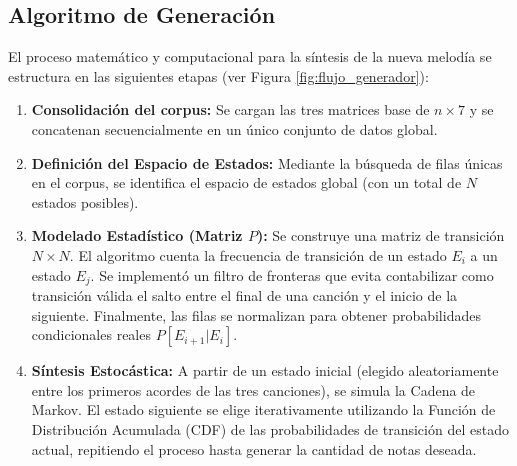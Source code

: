 \documentclass{article}
\theoremstyle{plain}
\theoremstyle{definition}
\begin{document}
\subsection*{Algoritmo de Generación}
El proceso matemático y computacional para la síntesis de la nueva melodía se estructura en las siguientes etapas (ver Figura \ref{fig:flujo_generador}):

\begin{enumerate}
	\item \textbf{Consolidación del corpus:} Se cargan las tres matrices base de $n \times 7$ y se concatenan secuencialmente en un único conjunto de datos global.
	\item \textbf{Definición del Espacio de Estados:} Mediante la búsqueda de filas únicas en el corpus, se identifica el espacio de estados global (con un total de $N$ estados posibles).
	\item \textbf{Modelado Estadístico (Matriz $P$):} Se construye una matriz de transición $N \times N$. El algoritmo cuenta la frecuencia de transición de un estado $E_i$ a un estado $E_j$. Se implementó un filtro de fronteras que evita contabilizar como transición válida el salto entre el final de una canción y el inicio de la siguiente. Finalmente, las filas se normalizan para obtener probabilidades condicionales reales $P[E_{i+1}|E_i]$.
	\item \textbf{Síntesis Estocástica:} A partir de un estado inicial (elegido aleatoriamente entre los primeros acordes de las tres canciones), se simula la Cadena de Markov. El estado siguiente se elige iterativamente utilizando la Función de Distribución Acumulada (CDF) de las probabilidades de transición del estado actual, repitiendo el proceso hasta generar la cantidad de notas deseada.
\end{enumerate}
\end{document}
